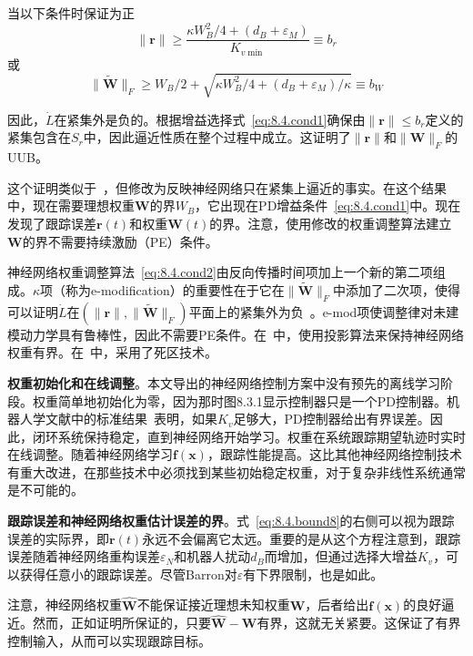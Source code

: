 \documentclass[12pt,a4paper]{ctexart}
\begin{document}
当以下条件时保证为正
\begin{equation}\label{eq:8.4.bound8}
\|\bm{r}\| \geq \frac{\kappa W_B^2/4 + (d_B + \varepsilon_M)}{K_{v\min}} \equiv b_r
\end{equation}
或
\begin{equation}\label{eq:8.4.bound9}
\|\tilde{\bm{W}}\|_F \geq W_B/2 + \sqrt{\kappa W_B^2/4 + (d_B + \varepsilon_M)/\kappa} \equiv b_W
\end{equation}

因此，$\dot{L}$在紧集外是负的。根据增益选择式~\eqref{eq:8.4.cond1}确保由$\|\bm{r}\| \leq b_r$定义的紧集包含在$S_r$中，因此逼近性质在整个过程中成立。这证明了$\|\bm{r}\|$和$\|\bm{W}\|_F$的UUB。

这个证明类似于~\cite{narendra1987}，但修改为反映神经网络只在紧集上逼近的事实。在这个结果中，现在需要理想权重$\bm{W}$的界$W_B$，它出现在PD增益条件~\eqref{eq:8.4.cond1}中。现在发现了跟踪误差$\bm{r}(t)$和权重$\bm{W}(t)$的界。注意，使用修改的权重调整算法建立$\bm{W}$的界不需要持续激励（PE）条件。

神经网络权重调整算法~\eqref{eq:8.4.cond2}由反向传播时间项加上一个新的第二项组成。$\kappa$项（称为e-modification）的重要性在于它在$\|\tilde{\bm{W}}\|_F$中添加了二次项，使得可以证明$\dot{L}$在$(\|\bm{r}\|, \|\tilde{\bm{W}}\|_F)$平面上的紧集外为负~\cite{narendra1987}。e-mod项使调整律对未建模动力学具有鲁棒性，因此不需要PE条件。在~\cite{polycarpou1991}中，使用投影算法来保持神经网络权重有界。在~\cite{chen1992,chen1994}中，采用了死区技术。

\textbf{权重初始化和在线调整}。本文导出的神经网络控制方案中没有预先的离线学习阶段。权重简单地初始化为零，因为那时图8.3.1显示控制器只是一个PD控制器。机器人学文献中的标准结果~\cite{dawson1990}表明，如果$K_v$足够大，PD控制器给出有界误差。因此，闭环系统保持稳定，直到神经网络开始学习。权重在系统跟踪期望轨迹时实时在线调整。随着神经网络学习$\bm{f}(\bm{x})$，跟踪性能提高。这比其他神经网络控制技术有重大改进，在那些技术中必须找到某些初始稳定权重，对于复杂非线性系统通常是不可能的。

\textbf{跟踪误差和神经网络权重估计误差的界}。式~\eqref{eq:8.4.bound8}的右侧可以视为跟踪误差的实际界，即$\bm{r}(t)$永远不会偏离它太远。重要的是从这个方程注意到，跟踪误差随着神经网络重构误差$\varepsilon_N$和机器人扰动$d_B$而增加，但通过选择大增益$K_v$，可以获得任意小的跟踪误差。尽管Barron对$\varepsilon$有下界限制，也是如此。

注意，神经网络权重$\hat{\bm{W}}$不能保证接近理想未知权重$\bm{W}$，后者给出$\bm{f}(\bm{x})$的良好逼近。然而，正如证明所保证的，只要$\hat{\bm{W}} - \bm{W}$有界，这就无关紧要。这保证了有界控制输入，从而可以实现跟踪目标。
\end{document}
